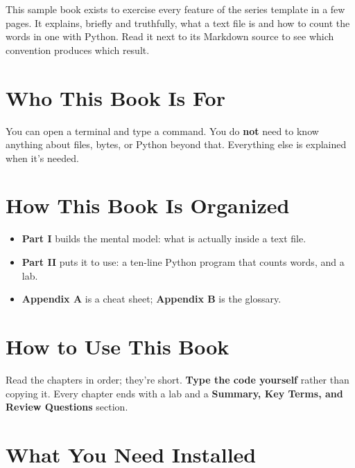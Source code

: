 
\begin{chapterintro}

This sample book exists to exercise every feature of the series template in a few pages. It explains, briefly and truthfully, what a text file is and how to count the words in one with Python. Read it next to its Markdown source to see which convention produces which result.

\end{chapterintro}

\section{Who This Book Is For}\label{00-preface:who-this-book-is-for}

You can open a terminal and type a command. You do \textbf{not} need to know anything about files, bytes, or Python beyond that. Everything else is explained when it's needed.

\section{How This Book Is Organized}\label{00-preface:how-this-book-is-organized}

\begin{itemize}
\tightlist
\item
  \textbf{Part I} builds the mental model: what is actually inside a text file.
\item
  \textbf{Part II} puts it to use: a ten-line Python program that counts words, and a lab.
\item
  \textbf{Appendix A} is a cheat sheet; \textbf{Appendix B} is the glossary.
\end{itemize}

\section{How to Use This Book}\label{00-preface:how-to-use-this-book}

Read the chapters in order; they're short. \textbf{Type the code yourself} rather than copying it. Every chapter ends with a lab and a \textbf{Summary, Key Terms, and Review Questions} section.

\section{What You Need Installed}\label{00-preface:what-you-need-installed}


